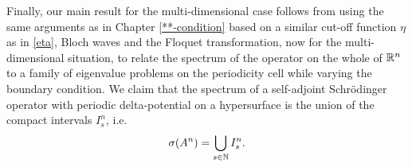 Finally, our main result for the multi-dimensional case follows from using the same arguments as in Chapter \ref{**-condition} based on a similar cut-off function $\eta$ as in \eqref{eta}, Bloch waves and the Floquet transformation, now for the multi-dimensional situation, to relate the spectrum of the operator on the whole of $\mathbb{R}^{n}$ to a family of eigenvalue problems on the periodicity cell while varying the boundary condition. We claim that the spectrum of a self-adjoint Schrödinger operator with periodic delta-potential on a hypersurface is the union of the compact intervals $I^{n}_{s}$, i.e.
	\[ \sigma(A^{n}) = \bigcup_{s \in \mathbb{N}} I^{n}_{s}. \]